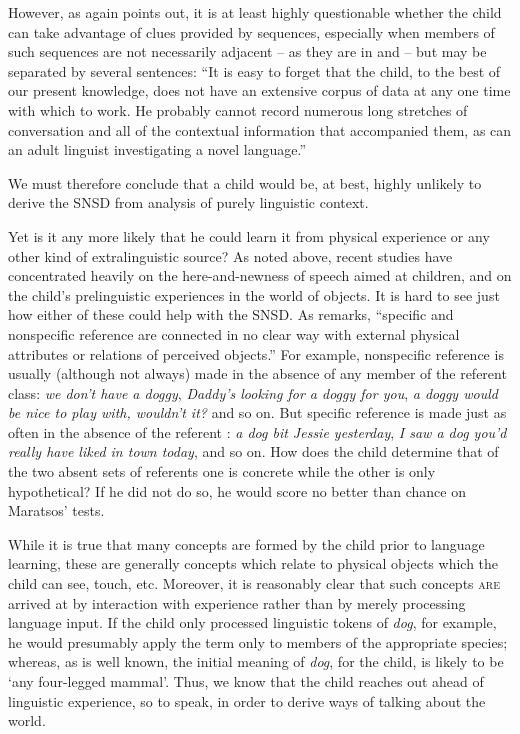 However, as \citet[95]{Maratsos1976} again points out, it is at least highly questionable whether the child can take advantage of clues provided by sequences, especially when members of such sequences are not necessarily adjacent -- as they are in  and  -- but may be separated by several sentences: ``It is easy to forget that the child, to the best of our present knowledge, does not have an extensive corpus of data at any one time with which to work. He probably cannot record numerous long stretches of conversation and all of the con\-textual information that accompanied them, as can an adult linguist investigating a novel language.''

We must therefore conclude that a child would be, at best, highly unlikely to derive the SNSD from analysis of purely linguistic context.

Yet is it any more likely that he could learn it from physical experience or any other kind of extralinguistic source? As noted above, recent studies have concentrated heavily on the here-and-newness of speech aimed at children, and on the child's prelinguistic experiences in the world of objects. It is hard to see just how either of these could help with the SNSD. As \citet[94]{Maratsos1976} remarks, ``specific and nonspecific reference are connected in no clear way with external physical attributes or relations of perceived objects.'' For example, nonspecific reference is usually (although not always) made in the absence of any member of the referent class: \textit{we don't have a doggy}, \textit{Daddy's looking for a doggy for you}, \textit{a doggy would be nice to play with, wouldn't it?} and so on. But specific reference is made just as often in the absence of the referent : \textit{a dog bit Jessie yesterday}, \textit{I saw a dog you'd really have liked in town today}, and so on. How does the child determine that of the two absent sets of referents one is concrete while the other is only hypothetical? If he did not do so, he would score no better than chance on Maratsos' tests.


While it is true that many concepts are formed by the child prior to language learning, these are generally concepts which relate to physical objects which the child can see, touch, etc. Moreover, it is reasonably clear that such concepts \textsc{are} arrived at by interaction with experience rather than by merely processing language input. If the child only processed linguistic tokens of \textit{dog}, for example, he would presumably apply the term only to members of the appropriate species; whereas, as is well known, the initial meaning of \textit{dog}, for the child, is likely to be `any four-legged mammal'. Thus, we know that the child reaches out ahead of linguistic experience, so to speak, in order to derive ways of talking about the world.

